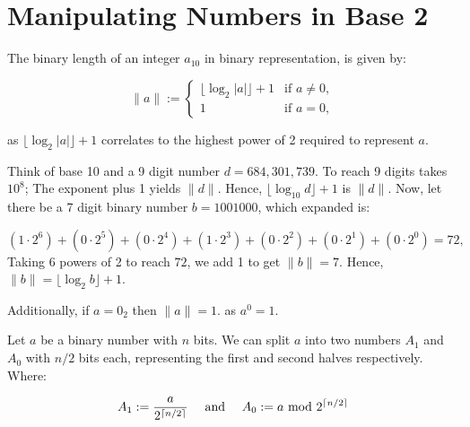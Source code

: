 \section{Manipulating Numbers in Base 2}

\label{sec:effic}

\begin{theo}
    
    The binary length of an integer $a_{10}$ in binary representation, is given by:
    
    \[
    \|a\| := 
    \begin{cases} 
    \lfloor \log_2 |a| \rfloor + 1 & \text{if } a \neq 0, \\
    1 & \text{if } a = 0,
    \end{cases}
    \]
    
    \noindent
    as $\lfloor \log_2 |a| \rfloor + 1$ correlates to the highest power of 2 required to represent $a$.
\end{theo}

\begin{Example}

\label{ex:log_length}

\vspace{-1em}
Think of base 10 and a 9 digit number $d=684,301,739$.
To reach 9 digits takes $10^8$; The exponent plus 1 yields $\|d\|$. Hence, $\lfloor \log_{10} d\rfloor+1$ is $\|d\|$.
Now, let there be a 7 digit binary number $b=1001000$, which expanded is:

$$ (1\cdot 2^6) + (0\cdot 2^5) + (0\cdot 2^4) + (1\cdot 2^3) + (0\cdot 2^2) + (0\cdot 2^1) + (0\cdot 2^0) = 72,$$
\noindent
Taking $6$ powers of 2 to reach $72$, we add 1 to get $\|b\| = 7$. Hence, $\|b\| = \lfloor \log_2 b \rfloor + 1$.

\noindent
Additionally, if $a=0_2$ then $\|a\|=1$. as $a^0=1$.
\end{Example}


\begin{theo}

    Let $a$ be a binary number with $n$ bits. We can split $a$ into two numbers $A_1$ and $A_0$ with $n/2$ bits each,
    representing the first and second halves respectively. Where:
    
        $$A_1:=\frac{a}{2^{\lceil n/2\rceil}} \quad \text{ and } \quad A_0:=a \text{ mod } 2^{\lceil n/2\rceil}$$

\end{theo}

